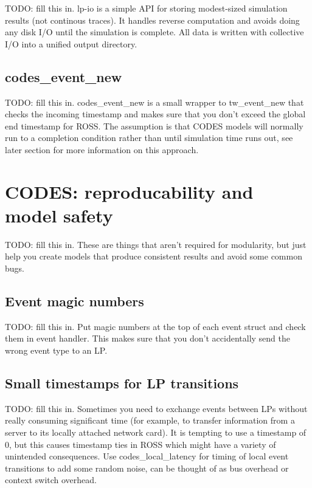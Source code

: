 \documentclass[conference,10pt,compsocconf,onecolumn]{IEEEtran}
\begin{document}
TODO: fill this in.  lp-io is a simple API for storing modest-sized
simulation results (not continous traces).  It handles reverse computation
and avoids doing any disk I/O until the simulation is complete.  All data is
written with collective I/O into a unified output directory.

\subsection{codes\_event\_new}

TODO: fill this in.  codes\_event\_new is a small wrapper to tw\_event\_new
that checks the incoming timestamp and makes sure that you don't exceed the
global end timestamp for ROSS.  The assumption is that CODES models will
normally run to a completion condition rather than until simulation time
runs out, see later section for more information on this approach.

\section{CODES: reproducability and model safety}

TODO: fill this in.  These are things that aren't required for modularity,
but just help you create models that produce consistent results and avoid
some common bugs.

\subsection{Event magic numbers}

TODO: fill this in.  Put magic numbers at the top of each event struct and
check them in event handler.  This makes sure that you don't accidentally
send the wrong event type to an LP.

\subsection{Small timestamps for LP transitions}

TODO: fill this in.  Sometimes you need to exchange events between LPs
without really consuming significant time (for example, to transfer
information from a server to its locally attached network card).  It is
tempting to use a timestamp of 0, but this causes timestamp ties in ROSS
which might have a variety of unintended consequences.  Use
codes\_local\_latency for timing of local event transitions to add some
random noise, can be thought of as bus overhead or context switch overhead.
\end{document}
